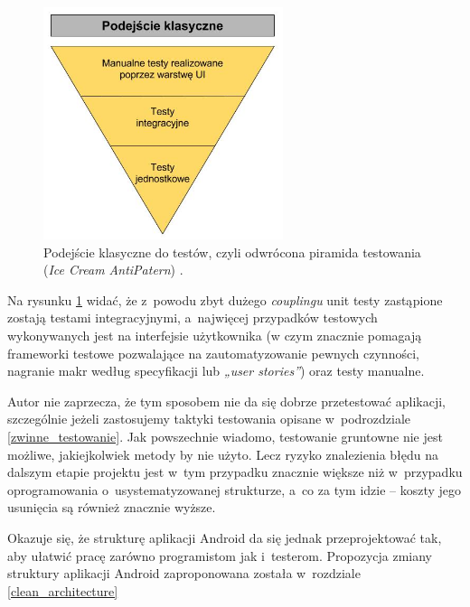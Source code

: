 \begin{figure}[!htb]
    \centering
    \includegraphics[width=7cm]{imgs/ch3_odwrocona_piramida.jpg}
    \caption
{Podejście klasyczne do testów, czyli odwrócona piramida testowania (\textit{Ice Cream AntiPatern}) \cite{website:piramidatestow}.}
    \label{fig:odwrocona_piramida}
\end{figure} 

Na rysunku \ref{fig:odwrocona_piramida} widać, że z~powodu zbyt dużego \textit{couplingu} unit testy zastąpione zostają testami integracyjnymi, a~najwięcej przypadków testowych wykonywanych jest na interfejsie użytkownika (w czym znacznie pomagają frameworki testowe pozwalające na zautomatyzowanie pewnych czynności, nagranie makr według specyfikacji lub \textit{„user stories”}) oraz testy manualne.

Autor nie zaprzecza, że tym sposobem nie da się dobrze przetestować aplikacji, szczególnie jeżeli zastosujemy taktyki testowania opisane w~podrozdziale \ref{zwinne_testowanie}. Jak powszechnie wiadomo, testowanie gruntowne nie jest możliwe, jakiejkolwiek metody by nie użyto. Lecz ryzyko znalezienia błędu na dalszym etapie projektu jest w~tym przypadku znacznie większe niż w~przypadku oprogramowania o~usystematyzowanej strukturze, a~co za tym idzie – koszty jego usunięcia są również znacznie wyższe.

Okazuje się, że strukturę aplikacji Android da się jednak przeprojektować tak, aby ułatwić pracę zarówno programistom jak i~testerom. Propozycja zmiany struktury aplikacji Android zaproponowana została w~rozdziale \ref{clean_architecture}

